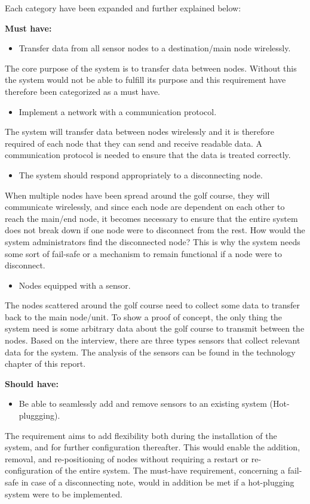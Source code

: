 \pagebreak


Each category have been expanded and further explained below:

\textbf{Must have:}
\begin{itemize}
\item Transfer data from all sensor nodes to a destination/main node wirelessly.
\end{itemize}
The core purpose of the system is to transfer data between nodes. Without this the system would not be able to fulfill its purpose and this requirement have therefore been categorized as a must have.


\begin{itemize}
\item Implement a network with a communication protocol.
\end{itemize}
The system will transfer data between nodes wirelessly and it is therefore required of each node that they can send and receive readable data. A communication protocol is needed to ensure that the data is treated correctly.


\begin{itemize}
\item The system should respond appropriately to a disconnecting node.
\end{itemize}
When multiple nodes have been spread around the golf course, they will communicate wirelessly, and since each node are dependent on each other to reach the main/end node, it becomes necessary to ensure that the entire system does not break down if one node were to disconnect from the rest. How would the system administrators find the disconnected node? This is why the system needs some sort of fail-safe or a mechanism to remain functional if a node were to disconnect.


\begin{itemize}
\item Nodes equipped with a sensor.
\end{itemize}
The nodes scattered around the golf course need to collect some data to transfer back to the main node/unit. To show a proof of concept, the only thing the system need is some arbitrary data about the golf course to transmit between the nodes. Based on the interview, there are three types sensors that collect relevant data for the system. The analysis of the sensors can be found in the technology chapter of this report.


\textbf{Should have:}
\begin{itemize}
\item Be able to seamlessly add and remove sensors to an existing system (Hot-pluggging).
\end{itemize}
The requirement aims to add flexibility both during the installation of the system, and for further configuration thereafter. This would enable the addition, removal, and re-positioning of nodes without requiring a restart or re-configuration of the entire system. The must-have requirement, concerning a fail-safe in case of a disconnecting note, would in addition be met if a hot-plugging system were to be implemented.


